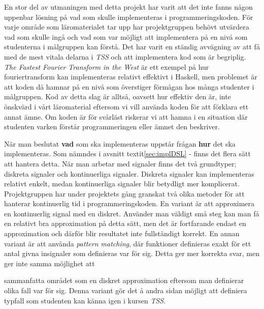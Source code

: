 \documentclass[]{article}
\begin{document}
En stor del av utmaningen med detta projekt har varit att det inte
fanns någon uppenbar lösning på vad som skulle implementeras i
programmeringskoden. För varje område som läromaterialet tar upp har
projektgruppen behövt utvärdera vad som skulle ingå och vad som var
möjligt att implementera på en nivå som studenterna i målgruppen kan
förstå. Det har varit en ständig avvägning av att få med de mest
vitala delarna i \textit{TSS} och att implementera kod som är
begriplig. \textit{The Fastest Fourier Transform in the
 West} \cite{fastestfourier} %
är ett exempel på hur fouriertransform kan implementeras relativt
effektivt i Haskell, men problemet är att koden då hamnar på en nivå
som överstiger förmågan hos många studenter i målgruppen. Kod av detta
slag är alltså, oavsett hur effektiv den är, inte önskvärd i vårt
läromaterial eftersom vi vill använda koden för att förklara ett annat
ämne. Om koden är för svårläst riskerar vi att hamna i en situation
där studenten varken förstår programmeringen eller ämnet den
beskriver.

När man beslutat \textbf{vad} som ska implementeras uppstår frågan
\textbf{hur} det ska implementeras. Som nämndes i
avsnitt textit{\ref{sec:implDSL} - }
finns det flera sätt att hantera detta. När man arbetar med signaler
finns det två grundtyper; diskreta signaler och kontinuerliga
signaler. Diskreta signaler kan implementeras relativt enkelt, medan
kontinuerliga signaler blir betydligt mer komplicerat. Projektgruppen
har under projektets gång granskat två olika metoder för att hanterar
kontinuerlig tid i programmeringskoden. En variant är att approximera
en kontinuerlig signal med en diskret. Använder man väldigt små steg
kan man få en relativt bra approximation på detta sätt, men det är
fortfarande endast en approximation och därför blir resultatet inte
fullständigt korrekt.
En annan variant är att använda \textit{pattern matching}, där
funktioner definieras exakt för ett antal givna insignaler som
definieras var för sig. Detta ger mer korrekta svar, men ger inte
samma möjlighet att

sammanfatta 
området som en diskret approximation eftersom man definierar 
olika fall var för sig. Denna
variant gör det å andra sidan möjligt att definiera typfall som
studenten kan känna igen i kursen \textit{TSS}.
\end{document}
